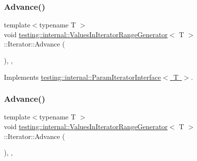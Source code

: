 \subsubsection{\texorpdfstring{Advance()}{Advance()}\hspace{0.1cm}{\footnotesize\ttfamily [2/3]}}
{\footnotesize\ttfamily template$<$typename T $>$ \\
void \mbox{\hyperlink{classtesting_1_1internal_1_1_values_in_iterator_range_generator}{testing\+::internal\+::\+Values\+In\+Iterator\+Range\+Generator}}$<$ T $>$\+::Iterator\+::\+Advance (\begin{DoxyParamCaption}{ }\end{DoxyParamCaption})\hspace{0.3cm}{\ttfamily [inline]}, {\ttfamily [override]}, {\ttfamily [virtual]}}



Implements \mbox{\hyperlink{classtesting_1_1internal_1_1_param_iterator_interface_a600dbd35fcb551463e379516a1abea48}{testing\+::internal\+::\+Param\+Iterator\+Interface$<$ T $>$}}.

\mbox{\label{classtesting_1_1internal_1_1_values_in_iterator_range_generator_1_1_iterator_a5ff56489536cf5d90ed0ac07ffeb476b}} 
\subsubsection{\texorpdfstring{Advance()}{Advance()}\hspace{0.1cm}{\footnotesize\ttfamily [3/3]}}
{\footnotesize\ttfamily template$<$typename T $>$ \\
void \mbox{\hyperlink{classtesting_1_1internal_1_1_values_in_iterator_range_generator}{testing\+::internal\+::\+Values\+In\+Iterator\+Range\+Generator}}$<$ T $>$\+::Iterator\+::\+Advance (\begin{DoxyParamCaption}{ }\end{DoxyParamCaption})\hspace{0.3cm}{\ttfamily [inline]}, {\ttfamily [override]}, {\ttfamily [virtual]}}



